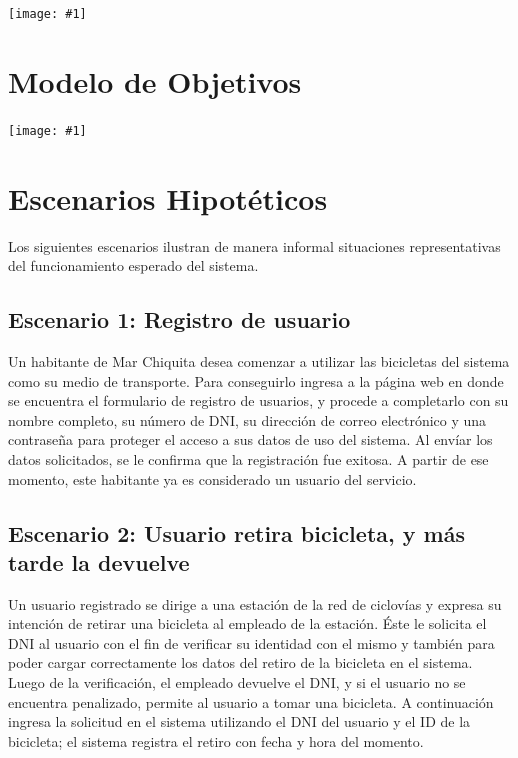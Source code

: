 \documentclass[a4paper, 10pt, twoside]{article}
\newcommand{\diagrama}[1]{
  \texttt{[image: \#1]}
}
\begin{document}
\diagrama{diagrama-de-contexto.png}




\section{Modelo de Objetivos}

\diagrama{images/LN_6.png}




\section{Escenarios Hipotéticos}


Los siguientes escenarios ilustran de manera informal situaciones representativas del funcionamiento esperado del sistema.


\subsection{Escenario 1: Registro de usuario}

Un habitante de Mar Chiquita desea comenzar a utilizar las bicicletas del sistema como su medio de transporte. Para conseguirlo ingresa a la página web en donde se encuentra el formulario de registro de usuarios, y procede a completarlo con su nombre completo, su número de DNI, su dirección de correo electrónico y una contraseña para proteger el acceso a sus datos de uso del sistema. Al envíar los datos solicitados, se le confirma que la registración fue exitosa. A partir de ese momento, este habitante ya es considerado un usuario del servicio.


\subsection{Escenario 2: Usuario retira bicicleta, y más tarde la devuelve}

Un usuario registrado se dirige a una estación de la red de ciclovías y expresa su intención de retirar una bicicleta al empleado de la estación. Éste le solicita el DNI al usuario con el fin de verificar su identidad con el mismo y también para poder cargar correctamente los datos del retiro de la bicicleta en el sistema. Luego de la verificación, el empleado devuelve el DNI, y si el usuario no se encuentra penalizado, permite al usuario a tomar una bicicleta. A continuación ingresa la solicitud en el sistema utilizando el DNI del usuario y el ID de la bicicleta; el sistema registra el retiro con fecha y hora del momento.
\end{document}
